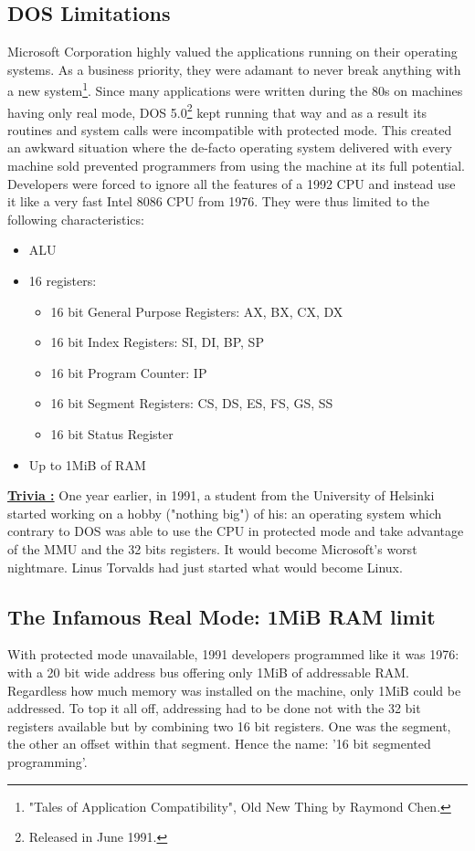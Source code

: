 \documentclass[book.tex]{subfiles}
\begin{document}
  \subsection{DOS Limitations}
  Microsoft Corporation highly valued the applications running on their operating systems. As a business priority, they were adamant to never break anything with a new system\footnote{"Tales of Application Compatibility", Old New Thing by Raymond Chen.}.  Since many applications were written during the 80s on machines having only real mode, DOS 5.0\footnote{Released in June 1991.} kept running that way and as a result its routines and system calls were incompatible with protected mode. This created an awkward situation where the de-facto operating system delivered with every machine sold prevented programmers from using the machine at its full potential. Developers were forced to ignore all the features of a 1992 CPU and instead use it like a very fast Intel 8086 CPU from 1976. They were thus limited to the following characteristics: \\
\begin{itemize}
\item ALU
\item 16 registers:
\begin{itemize}
  \item 16 bit General Purpose Registers: AX, BX, CX, DX
  \item 16 bit Index Registers: SI, DI, BP, SP
  \item 16 bit Program Counter: IP
  \item 16 bit Segment Registers: CS, DS, ES, FS, GS, SS
  \item 16 bit Status Register
\end{itemize}
\item Up to 1MiB of RAM
\end{itemize}


\bigskip

 \textbf{\underline{Trivia :}} One year earlier, in 1991, a student from the University of Helsinki started working on a hobby ("nothing big") of his: an operating system which contrary to DOS was able to use the CPU in protected mode and take advantage of the MMU and the 32 bits registers. It would become Microsoft's worst nightmare. Linus Torvalds had just started what would become Linux.



  \subsection{The Infamous Real Mode: 1MiB RAM limit}
  With protected mode unavailable, 1991 developers programmed like it was 1976: with a 20 bit wide address bus offering only 1MiB of addressable RAM. Regardless how much memory was installed on the machine, only 1MiB could be addressed. To top it all off, addressing had to be done not with the 32 bit registers available but by combining two 16 bit registers. One was the segment, the other an offset within that segment. Hence the name: '16 bit segmented programming'.
\end{document}
